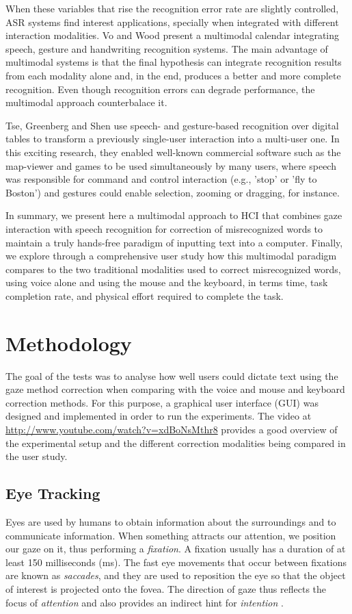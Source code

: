 \documentclass[]{article}
\begin{document}
When these variables that rise the recognition error rate are slightly controlled, ASR systems find interest applications, specially when
integrated with different interaction modalities. Vo and Wood \cite{VoWood550794} present a multimodal calendar integrating speech, gesture and
handwriting recognition systems. The main advantage of multimodal systems is that the final hypothesis can integrate recognition results
from each modality alone and, in the end, produces a better and more complete recognition. Even though recognition errors can degrade
performance, the multimodal approach counterbalace it.


Tse, Greenberg and Shen \cite{Tse2006} use speech- and gesture-based recognition over digital tables to transform a previously single-user
interaction into a multi-user one. In this exciting research, they enabled well-known commercial software such as the map-viewer and games
to be used simultaneously by many users, where speech was responsible for command and control interaction (e.g., 'stop' or 'fly to Boston')
and gestures could enable selection, zooming or dragging, for instance.


In summary, we present here a multimodal approach to HCI that combines gaze 
interaction with speech recognition for correction of misrecognized words to maintain a truly hands-free paradigm of
inputting text into a computer. Finally, we explore through a comprehensive user study how this multimodal paradigm
compares to the two traditional modalities used to correct misrecognized words, using voice alone and using the mouse
and the keyboard, in terms time, task completion rate, and physical effort required to complete the task.


\section{Methodology}
The goal of the tests was to analyse how well users could dictate text using the gaze method correction
when comparing with the voice and mouse and keyboard correction methods. For this purpose, a graphical user
interface (GUI) was designed and implemented in order to run the experiments. The video at
\url{http://www.youtube.com/watch?v=xdBoNsMthr8} provides a good overview of the experimental setup and the
different correction modalities being compared in the user study.


\subsection{Eye Tracking}
Eyes are used by humans to obtain information about the surroundings and to
communicate information. When something attracts our attention, we position our
gaze on it, thus performing a \textit{fixation}. A fixation usually has a
duration of at least 150 milliseconds (ms). The fast eye movements that
occur between fixations are known as \textit{saccades}, and they are used to
reposition the eye so that the object of interest is projected onto the fovea.
The direction of gaze thus reflects the focus of 
\textit{attention} and also provides an indirect hint for \textit{intention}
\cite{velichkovsky}.
\end{document}
